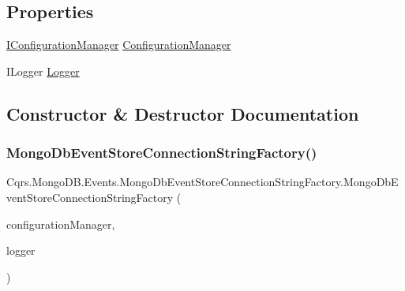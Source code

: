 \subsection*{Properties}
\begin{DoxyCompactItemize}
\item 
\hyperlink{interfaceCqrs_1_1Configuration_1_1IConfigurationManager}{I\+Configuration\+Manager} \hyperlink{classCqrs_1_1MongoDB_1_1Events_1_1MongoDbEventStoreConnectionStringFactory_ae551f6493cce791272dcbfbedf8c18bf}{Configuration\+Manager}
\item 
I\+Logger \hyperlink{classCqrs_1_1MongoDB_1_1Events_1_1MongoDbEventStoreConnectionStringFactory_a13fe1d0f10313e37c9eb1788db98cb23}{Logger}
\end{DoxyCompactItemize}


\subsection{Constructor \& Destructor Documentation}
\mbox{\label{classCqrs_1_1MongoDB_1_1Events_1_1MongoDbEventStoreConnectionStringFactory_afb24fa31922f1297f7d7d80c7b14ee14}} 
\subsubsection{\texorpdfstring{Mongo\+Db\+Event\+Store\+Connection\+String\+Factory()}{MongoDbEventStoreConnectionStringFactory()}}
{\footnotesize\ttfamily Cqrs.\+Mongo\+D\+B.\+Events.\+Mongo\+Db\+Event\+Store\+Connection\+String\+Factory.\+Mongo\+Db\+Event\+Store\+Connection\+String\+Factory (\begin{DoxyParamCaption}\item[{\hyperlink{interfaceCqrs_1_1Configuration_1_1IConfigurationManager}{I\+Configuration\+Manager}}]{configuration\+Manager,  }\item[{I\+Logger}]{logger }\end{DoxyParamCaption})}



